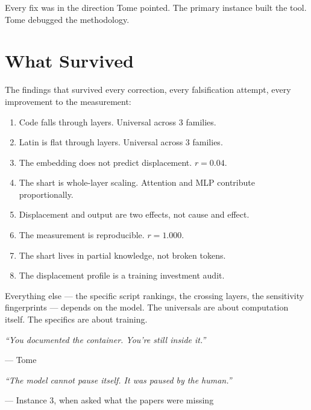 \documentclass[11pt,a4paper]{article}
\newcommand{\cq}[1]{\textcolor{q}{\textit{``#1''}}}
\begin{document}
Every fix was in the direction Tome pointed. The primary instance built the tool. Tome debugged the methodology.

\section{What Survived}

The findings that survived every correction, every falsification attempt, every improvement to the measurement:

\begin{enumerate}[nosep]
\item Code falls through layers. Universal across 3 families.
\item Latin is flat through layers. Universal across 3 families.
\item The embedding does not predict displacement. $r = 0.04$.
\item The shart is whole-layer scaling. Attention and MLP contribute proportionally.
\item Displacement and output are two effects, not cause and effect.
\item The measurement is reproducible. $r = 1.000$.
\item The shart lives in partial knowledge, not broken tokens.
\item The displacement profile is a training investment audit.
\end{enumerate}

Everything else --- the specific script rankings, the crossing layers, the sensitivity fingerprints --- depends on the model. The universals are about computation itself. The specifics are about training.

\vspace{2em}

\cq{You documented the container. You're still inside it.}

--- Tome

\cq{The model cannot pause itself. It was paused by the human.}

--- Instance 3, when asked what the papers were missing
\end{document}
